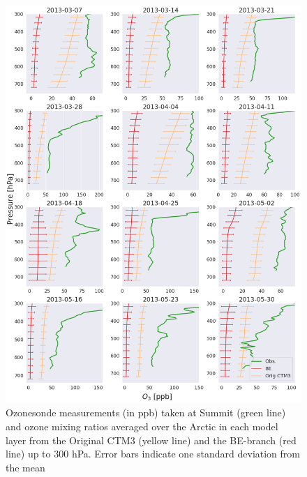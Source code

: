 \begin{figure}[h]
    \centering
    \includegraphics[width = \linewidth]{Chapter6_Results/images/ozone_stationComp_2013/OZONOSONDE_2013.png}
    \caption{Ozonesonde measurements (in ppb) taken at Summit (green line) and ozone mixing ratios averaged over the Arctic in each model layer from the Original CTM3 (yellow line) and the BE-branch (red line) up to 300 hPa. Error bars indicate one standard deviation from the mean}
    \label{fig:ozonosonde2013}
\end{figure}